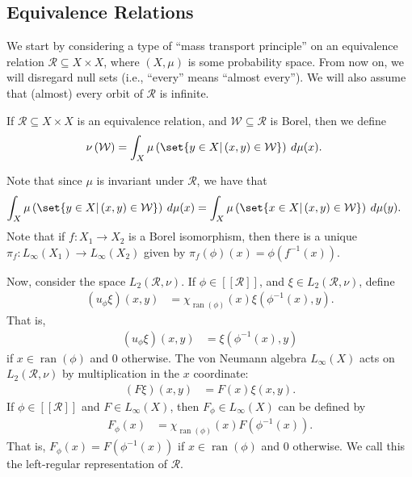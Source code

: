 \documentclass[10pt]{mypackage}
\begin{document}
\subsection{Equivalence Relations}%
We start by considering a type of ``mass transport principle'' on an equivalence relation $\mathcal{R}\subseteq X\times X$, where $\left( X,\mu \right)$ is some probability space. From now on, we will disregard null sets (i.e., ``every'' means ``almost every''). We will also assume that (almost) every orbit of $\mathcal{R}$ is infinite.
\begin{definition}
  If $\mathcal{R}\subseteq X\times X$ is an equivalence relation, and $\mathcal{W}\subseteq \mathcal{R}$ is Borel, then we define
  \begin{align*}
    \nu\left( \mathcal{W} \right) &= \int_{X}^{} \mu\left( \set{y\in X | \left( x,y \right)\in \mathcal{W}} \right)\:d\mu(x).
  \end{align*}
\end{definition}
Note that since $\mu$ is invariant under $\mathcal{R}$, we have that
\begin{align*}
  \int_{X}^{} \mu\left( \set{y\in X | \left( x,y \right)\in \mathcal{W}} \right)\:d\mu(x) &= \int_{X}^{} \mu\left( \set{x\in X | \left( x,y \right)\in \mathcal{W}} \right)\:d\mu(y).
\end{align*}
Note that if $f\colon X_1\rightarrow X_2$ is a Borel isomorphism, then there is a unique $\pi_{f}\colon L_{\infty}\left( X_1 \right)\rightarrow L_{\infty}\left( X_2 \right)$ given by $\pi_{f}\left( \phi \right)\left( x \right) = \phi\left( f^{-1}(x) \right)$.

Now, consider the space $L_2\left( \mathcal{R},\nu \right)$. If $\phi\in \left[ \left[ \mathcal{R} \right] \right]$, and $\xi\in L_2\left( \mathcal{R},\nu \right)$, define
\begin{align*}
  \left( u_{\phi}\xi \right)\left( x,y \right) &= \chi_{\operatorname{ran}\left( \phi \right)}(x)\xi\left( \phi^{-1}\left( x \right),y \right).
\end{align*}
That is,
\begin{align*}
  \left( u_{\phi}\xi \right)\left( x,y \right) &= \xi\left( \phi^{-1}(x),y \right)
\end{align*}
if $x\in \operatorname{ran}\left( \phi \right)$ and $0$ otherwise. The von Neumann algebra $L_{\infty}(X)$ acts on $L_2\left( \mathcal{R},\nu \right)$ by multiplication in the $x$ coordinate:
\begin{align*}
  \left( F\xi \right)\left( x,y \right) &= F\left( x \right)\xi\left( x,y \right).
\end{align*}
If $\phi\in \left[ \left[ \mathcal{R} \right] \right]$ and $F\in L_{\infty}\left( X \right)$, then $F_{\phi}\in L_{\infty}\left( X \right)$ can be defined by
\begin{align*}
  F_{\phi}(x) &= \chi_{\operatorname{ran}\left( \phi \right)}(x)F\left( \phi^{-1}\left( x \right) \right).
\end{align*}
That is, $F_{\phi}(x) = F\left( \phi^{-1}\left( x \right) \right)$ if $x\in \operatorname{ran}\left( \phi \right)$ and $0$ otherwise. We call this the left-regular representation of $\mathcal{R}$.
\end{document}
